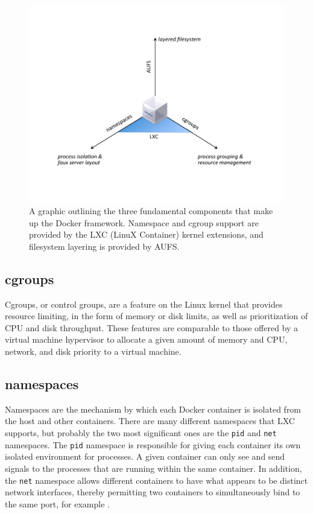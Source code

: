 \begin{figure}[h]
\centering
    \includegraphics[width=1.0\textwidth]{docker.pdf}
    \caption{A graphic outlining the three fundamental components that make up the Docker framework. Namespace and cgroup support are provided by the LXC (LinuX Container) kernel extensions, and filesystem layering is provided by AUFS.}
\end{figure}

\subsection{cgroups}
Cgroups, or control groups, are a feature on the Linux kernel that provides resource limiting, in the form of memory or disk limits, as well as prioritization of CPU and disk throughput. These features are comparable to those offered by a virtual machine hypervisor to allocate a given amount of memory and CPU, network, and disk priority to a virtual machine.

\subsection{namespaces}

Namespaces are the mechanism by which each Docker container is isolated from the host and other containers. There are many different namespaces that LXC supports, but probably the two most significant ones are the \texttt{pid} and \texttt{net} namespaces. The \texttt{pid} namespace is responsible for giving each container its own isolated environment for processes. A given container can only see and send signals to the processes that are running within the same container. In addition, the \texttt{net} namespace allows different containers to have what appears to be distinct network interfaces, thereby permitting two containers to simultaneously bind to the same port, for example \cite{lxc}.

